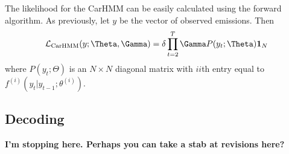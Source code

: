 The likelihood for the CarHMM can be easily calculated using the forward algorithm.  As previously, let $y$ be the vector of observed emissions.  Then
\begin{equation}
\calL_{\text{CarHMM}}(y;\Theta,\Gamma) = \delta \prod_{t=2}^T \Gamma P(y_t;\Theta) \mathbf{1}_N
\label{CarHMM_likelihood}
\end{equation}
where
%
$P(y_t;\Theta)$ is an $N \times N$ diagonal matrix with $ii$th entry equal to $f^{(i)}(y_t|y_{t-1}; \theta^{(i)})$.
%

\subsection{Decoding}

{\bf{I'm stopping here.  Perhaps you can take a stab at revisions here?}}

